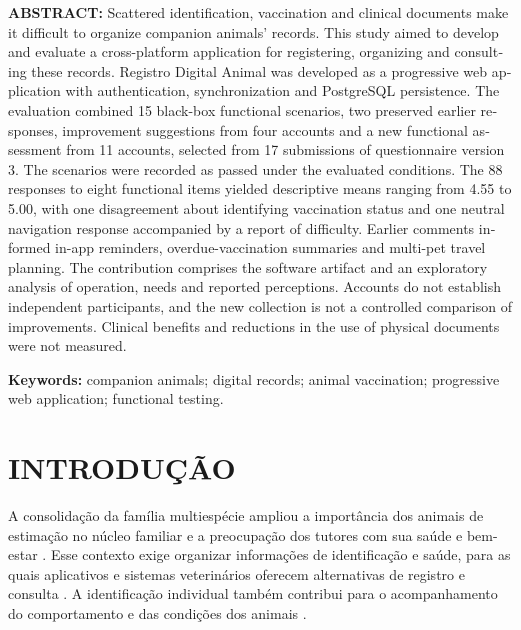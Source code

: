 \documentclass{UNESC}
\begin{document}
\vspace{1.0em}
\noindent
\newpage
\begin{otherlanguage}{english}
\noindent\textbf{ABSTRACT:} Scattered identification, vaccination and clinical documents make it difficult to organize companion animals' records. This study aimed to develop and evaluate a cross-platform application for registering, organizing and consulting these records. Registro Digital Animal was developed as a progressive web application with authentication, synchronization and PostgreSQL persistence. The evaluation combined 15 black-box functional scenarios, two preserved earlier responses, improvement suggestions from four accounts and a new functional assessment from 11 accounts, selected from 17 submissions of questionnaire version 3. The scenarios were recorded as passed under the evaluated conditions. The 88 responses to eight functional items yielded descriptive means ranging from 4.55 to 5.00, with one disagreement about identifying vaccination status and one neutral navigation response accompanied by a report of difficulty. Earlier comments informed in-app reminders, overdue-vaccination summaries and multi-pet travel planning. The contribution comprises the software artifact and an exploratory analysis of operation, needs and reported perceptions. Accounts do not establish independent participants, and the new collection is not a controlled comparison of improvements. Clinical benefits and reductions in the use of physical documents were not measured.

\vspace{0.5em}
\noindent
\textbf{Keywords:} companion animals; digital records; animal vaccination; progressive web application; functional testing.

\end{otherlanguage}

\section{INTRODUÇÃO}

A consolidação da família multiespécie ampliou a importância dos animais de estimação no núcleo familiar e a preocupação dos tutores com sua saúde e bem-estar \cite{BOLSON2022,VIEIRA2020}. Esse contexto exige organizar informações de identificação e saúde, para as quais aplicativos e sistemas veterinários oferecem alternativas de registro e consulta \cite{MORAES2024}. A identificação individual também contribui para o acompanhamento do comportamento e das condições dos animais \cite{vidal2021}.
\end{document}
